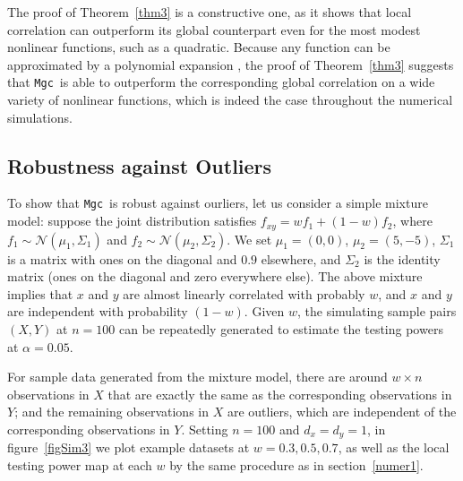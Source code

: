\documentclass[11pt]{article}
\newcommand{\note}[2][]{\added[#1,remark={#2}]{}}
\providecommand{\sct}[1]{{\sc \texttt{#1}}}
\providecommand{\mb}[1]{\boldsymbol{#1}}
\providecommand{\mc}[1]{\mathcal{#1}}
\newcommand{\T}{^{\ensuremath{\mathsf{T}}}}           %
\newcommand{\Mgc}{\sct{Mgc}}
\newcommand{\jovo}[1]{{\note{jv: #1}}}
\newcommand{\cs}[1]{{\note{cs: #1}}}
\begin{document}
The proof of Theorem~\ref{thm3} is a constructive one, as it shows that local correlation can outperform its global counterpart even for the most modest nonlinear functions, such as a quadratic.  Because any function can be approximated by a polynomial expansion \cite{RudinBook}, the proof of Theorem~\ref{thm3} suggests that \Mgc~is able to outperform the corresponding global correlation on a wide variety of nonlinear functions, which is indeed the case throughout the numerical simulations.


\subsection{Robustness against Outliers}
\label{main4}
To show that \Mgc~is robust against ourliers, let us consider a simple mixture model: suppose the joint distribution satisfies $f_{xy}=w f_{1}+(1-w) f_{2}$, where $f_{1} \sim \mc{N}(\mu_{1},\Sigma_{1})$ and $f_{2} \sim \mc{N}(\mu_{2},\Sigma_{2})$. We set $\mu_{1}=(0,0)$, $\mu_{2}=(5,-5)$, $\Sigma_{1}$ is a matrix with ones on the diagonal and $0.9$ elsewhere, 
 and $\Sigma_{2}$ is the identity matrix (ones on the diagonal and zero everywhere else). 
 The above mixture implies that $x$ and $y$ are almost linearly correlated with probably $w$, and $x$ and $y$ are independent with probability $(1-w)$. Given $w$, the simulating sample pairs $(X,Y)$ at $n=100$ can be repeatedly generated to estimate the testing powers at $\alpha=0.05$. 

For sample data generated from the mixture model, there are around $w \times n$ observations in $X$ that are exactly the same as the corresponding observations in $Y$; and the remaining observations in $X$ are outliers, which are independent of the corresponding observations in $Y$. Setting $n=100$ and $d_{x}=d_{y}=1$, in figure~\ref{figSim3} we plot example datasets at $w=0.3, 0.5, 0.7$, as well as the local testing power map at each $w$ by the same procedure as in section~\ref{numer1}. \jovo{fix after fixing figure} \cs{FIXED!}
\end{document}

